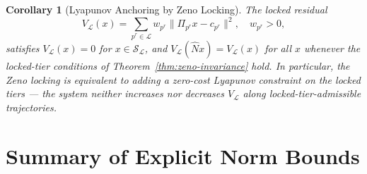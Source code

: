 \documentclass[11pt]{amsart}
\newtheorem{corollary}[theorem]{Corollary}
\newcommand{\Prj}{\Pi}
\newcommand{\bN}{\widehat{N}}
\newcommand{\norm}[1]{\lVert #1 \rVert}
\begin{document}
\begin{corollary}[Lyapunov Anchoring by Zeno Locking]\label{cor:lyapunov-anchor}
The locked residual
\[
  V_{\mathcal{L}}(x) = \sum_{p^r \in \mathcal{L}} w_{p^r} \norm{\Prj_{p^r} x - c_{p^r}}^2, \quad w_{p^r} > 0,
\]
satisfies $V_{\mathcal{L}}(x) = 0$ for $x \in \mathcal{S}_{\mathcal{L}}$, and $V_{\mathcal{L}}(\bN x) = V_{\mathcal{L}}(x)$ for all $x$ whenever the locked-tier conditions of Theorem~\ref{thm:zeno-invariance} hold. In particular, the Zeno locking is equivalent to adding a zero-cost Lyapunov constraint on the locked tiers — the system neither increases nor decreases $V_{\mathcal{L}}$ along locked-tier-admissible trajectories.
\end{corollary}

\section{Summary of Explicit Norm Bounds}
\label{sec:summary}
\end{document}
